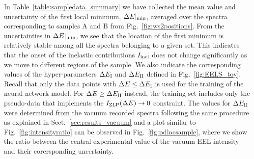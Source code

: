 In Table~\ref{table:sampledata_summary} we have collected the mean value 
and uncertainty of the first local minimum, $\Delta E|_{\rm min}$,
averaged over the spectra corresponding to samples A and B from
Fig.~\ref{fig:ws2positions}.
%
From the uncertainties in $\Delta E|_{\rm min}$, we see that the
location of the first minimum is relatively stable
among all the spectra belonging to a given set.
%
This indicates that the onset of the inelastic contributions $I_{\rm inel}$ does
not change significantly as we move to different regions of the sample.
%
We also indicate
the corresponding values of the hyper-parameters
$\Delta E_{\rm I}$ and $\Delta E_{\rm II}$ defined in Fig.~\ref{fig:EELS_toy}.
%
Recall that only
the data points with $\Delta E \le \Delta E_{\rm I}$ is used for the training
of the neural network model.
%
For $\Delta E \ge \Delta E_{\rm II}$ instead, the training set includes only the pseudo-data
that implements the $I_{\rm ZLP}(\Delta E)\to 0$ constraint.
%
The values for $\Delta E_{\rm II}$ were determined from the vacuum recorded spectra
following the same procedure as explained 
in Sect.~\ref{sec:results_vacuum} and a plot similar to Fig.~\ref{fig:intensityratio} 
can be observed in  Fig.~\ref{fig:pdlocsample}, where we show the ratio between the central
experimental value of the vacuum EEL intensity and their corersponding uncertainty.
%
